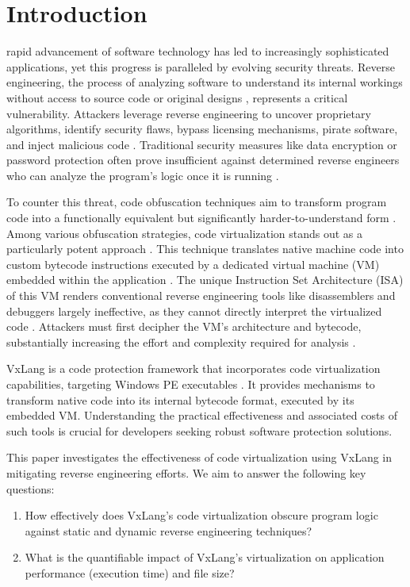 \section{Introduction}
 rapid advancement of software technology has led to increasingly sophisticated applications, yet this progress is paralleled by evolving security threats. Reverse engineering, the process of analyzing software to understand its internal workings without access to source code or original designs \cite{Has18}, represents a critical vulnerability. Attackers leverage reverse engineering to uncover proprietary algorithms, identify security flaws, bypass licensing mechanisms, pirate software, and inject malicious code \cite{Wak24}. Traditional security measures like data encryption or password protection often prove insufficient against determined reverse engineers who can analyze the program's logic once it is running \cite{Sec19}.

To counter this threat, code obfuscation techniques aim to transform program code into a functionally equivalent but significantly harder-to-understand form \cite{Jin24}. Among various obfuscation strategies, code virtualization stands out as a particularly potent approach \cite{Ore06, Zho24}. This technique translates native machine code into custom bytecode instructions executed by a dedicated virtual machine (VM) embedded within the application \cite{Don20}. The unique Instruction Set Architecture (ISA) of this VM renders conventional reverse engineering tools like disassemblers and debuggers largely ineffective, as they cannot directly interpret the virtualized code \cite{Sal18}. Attackers must first decipher the VM's architecture and bytecode, substantially increasing the effort and complexity required for analysis \cite{Hac24}.

VxLang is a code protection framework that incorporates code virtualization capabilities, targeting Windows PE executables \cite{VxLang}. It provides mechanisms to transform native code into its internal bytecode format, executed by its embedded VM. Understanding the practical effectiveness and associated costs of such tools is crucial for developers seeking robust software protection solutions.

This paper investigates the effectiveness of code virtualization using VxLang in mitigating reverse engineering efforts. We aim to answer the following key questions:
\begin{enumerate}
    \item How effectively does VxLang's code virtualization obscure program logic against static and dynamic reverse engineering techniques?
    \item What is the quantifiable impact of VxLang's virtualization on application performance (execution time) and file size?
\end{enumerate}

